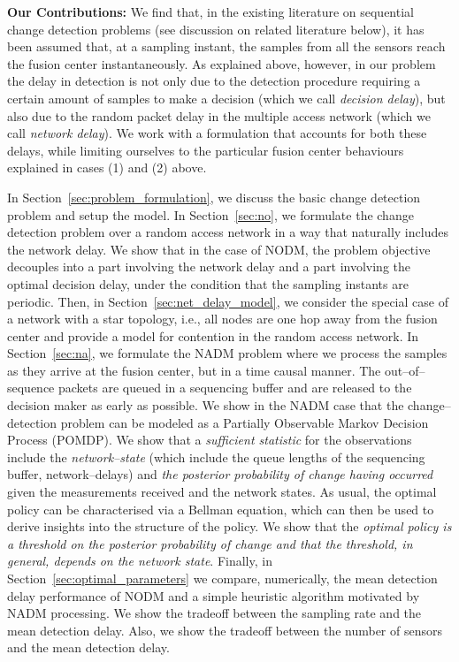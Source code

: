 \documentclass[acmtosn]{acmtrans2m}
\begin{document}
\noindent
\textbf{Our Contributions:} We find that, in the existing literature
on sequential change detection problems (see discussion on related literature 
below), it has been assumed
that, at a sampling instant, the samples from all the sensors reach
the fusion center instantaneously.  As explained above, however, in
our problem the delay in detection is not only due to the detection
procedure requiring a certain amount of samples to make a decision 
(which we call \emph{decision delay}), but also due to the random 
packet delay in the multiple access network (which we call 
\emph{network delay}). We work with a formulation that accounts for 
both these delays, while limiting ourselves to the particular fusion 
center behaviours explained in cases (1) and (2) above.

In Section~\ref{sec:problem_formulation}, we discuss the basic change
detection problem and setup the model. In Section~\ref{sec:no}, we
formulate the change detection problem over a random access network in a
way that naturally includes the network delay. We show that in the case
of {\sf NODM}, the problem objective decouples into a part involving the
network delay and a part involving the optimal decision delay, under the
condition that the sampling instants are periodic. Then, in
Section~\ref{sec:net_delay_model}, we consider the special case of a
network with a star topology, i.e., all nodes are one hop away from the
fusion center and provide a model for contention in the random access
network. In Section~\ref{sec:na}, we formulate the {\sf NADM} problem
where we process the samples as they arrive at the fusion center, but in
a time causal manner. The out--of--sequence packets are queued in a
sequencing buffer and are released to the decision maker as early as
possible. We show in the {\sf NADM} case that the change--detection
problem can be modeled as a Partially Observable Markov Decision Process
(POMDP). We show that a {\em sufficient statistic} for the observations
include the {\em network--state} (which include the queue lengths of the
sequencing buffer, network--delays) and {\em the posterior probability
of change having occurred} given the measurements received and the
network states. As usual, the optimal policy can be characterised via a
Bellman equation, which can then be used to derive insights into the
structure of the policy. We show that the {\em optimal policy is a
threshold on the posterior probability of change and that the threshold,
in general, depends on the network state}. Finally, in
Section~\ref{sec:optimal_parameters} we compare, numerically, the mean
detection delay performance of {\sf NODM} and a simple heuristic
algorithm motivated by {\sf NADM} processing. We show the tradeoff
between the sampling rate  and the mean detection delay. Also, we
show the tradeoff between the number of sensors and the mean detection
delay. 
\end{document}
